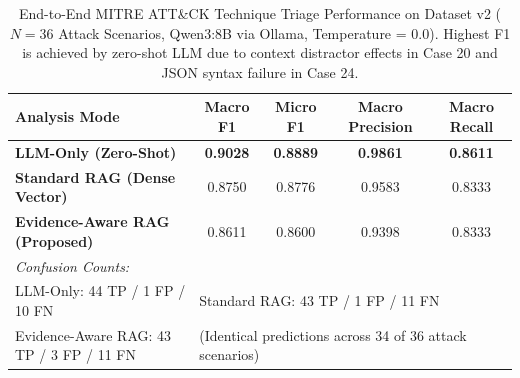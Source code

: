 \begin{table}[t]
\centering
\small
\caption{End-to-End MITRE ATT\&CK Technique Triage Performance on Dataset v2 ($N = 36$ Attack Scenarios, Qwen3:8B via Ollama, Temperature = 0.0). Highest F1 is achieved by zero-shot LLM due to context distractor effects in Case 20 and JSON syntax failure in Case 24.}
\label{tab:classification_results}
\begin{tabular}{lcccc}
\toprule
\textbf{Analysis Mode} & \textbf{Macro F1} & \textbf{Micro F1} & \textbf{Macro Precision} & \textbf{Macro Recall} \\
\midrule
\textbf{LLM-Only (Zero-Shot)} & \textbf{0.9028} & \textbf{0.8889} & \textbf{0.9861} & \textbf{0.8611} \\
\textbf{Standard RAG (Dense Vector)} & 0.8750 & 0.8776 & 0.9583 & 0.8333 \\
\textbf{Evidence-Aware RAG (Proposed)} & 0.8611 & 0.8600 & 0.9398 & 0.8333 \\
\midrule
\multicolumn{5}{l}{\textit{Confusion Counts:}} \\
\quad LLM-Only: 44 TP / 1 FP / 10 FN & \multicolumn{4}{l}{\quad Standard RAG: 43 TP / 1 FP / 11 FN} \\
\quad Evidence-Aware RAG: 43 TP / 3 FP / 11 FN & \multicolumn{4}{l}{\quad (Identical predictions across 34 of 36 attack scenarios)} \\
\bottomrule
\end{tabular}
\end{table}
